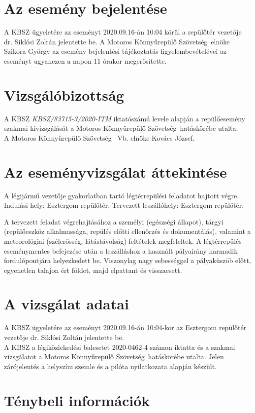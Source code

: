 \documentclass[a4paper,10pt]{article}
\newcommand{\mksz}{Motoros Könnyűrepülő Szövetség\ }
\begin{document}
\section*{Az esemény bejelentése}
A KBSZ ügyeletére az eseményt 2020.09.16-án 10:04 körül a repülőtér
vezetője dr. Siklósi Zoltán jelentette be. A \mksz  elnöke Szikora György
az esemény bejelentési tájékoztatás figyelembevételével az eseményt ugyanezen a napon 11 órakor megerősítette.

\section*{Vizsgálóbizottság}
A KBSZ \textit{KBSZ/83715-3/2020-ITM} iktatószámú levele alapján a 
repülőesemény szakmai kivizsgálását a \mksz hatáskörébe utalta.\\A \mksz
Vb. elnöke Kovács József.

\section*{Az eseményvizsgálat áttekintése}
A légijármű vezetője gyakorlatban tartó légtérrepülési feladatot hajtott
végre.
Indulási hely: Esztergom repülőtér. Tervezett leszállóhely: Esztergom
repülőtér.

A tervezett feladat végrehajtásához a személyi (egészségi állapot), tárgyi 
(repülőeszköz alkalmassága, repülés előtti ellenőrzés és dokumentálás), 
valamint a meteorológiai (szélerősség, látástávolság) feltételek
megfeleltek. 
A légtérrepülés eseménymentes befejezése után a leszálláshoz a használt 
pályairány harmadik fordulópontjára helyezkedett be. Viszonylag nagy 
sebességgel a pályaküszöb előtt, egyenetlen talajon ért földet, majd
elpattant és visszaesett.

\section*{A vizsgálat adatai}
A KBSZ ügyeletére az eseményt 2020.09.16-án 10:04-kor az Esztergom 
repülőtér vezetője dr. Siklósi Zoltán jelentette be.
\\
A KBSZ a légiközlekedési balesetet 2020-0462-4 számon iktatta és a szakmai 
vizsgálatot a \mksz hatáskörébe utalta. Jelen zárójelentés %
a helyszíni 
szemle és a pilóta nyilatkozata alapján készült.

\section{Ténybeli információk}
\end{document}
